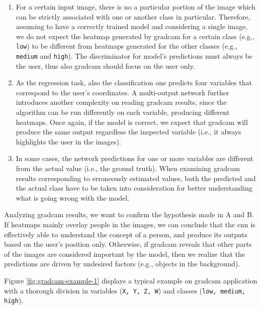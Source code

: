 \renewcommand{\labelenumi}{\Alph{enumi}}
\begin{enumerate}
    \item For a certain input image, there is no a particular portion of the image which can be strictly associated with one or another class in particular. Therefore, assuming to have a correctly trained model and considering a single image, we do not expect the heatmap generated by \gls{gradcam} for a certain class (e.g., \texttt{low}) to be different from heatmaps generated for the other classes (e.g., \texttt{medium} and \texttt{high}). The discriminator for model's predictions must always be the user, thus also \gls{gradcam} should focus on the user only.
    \item As the regression task, also the classification one predicts four variables that correspond to the user's coordinates. A multi-output network further introduces another complexity on reading \gls{gradcam} results, since the algorithm can be run differently on each variable, producing different heatmaps. Once again, if the model is correct, we expect that \gls{gradcam} will produce the same output regardless the inspected variable (i.e., it always highlights the user in the images).
    \item In some cases, the network predictions for one or more variables are different from the actual value (i.e., the ground truth). When examining \gls{gradcam} results corresponding to erroneously estimated values, both the predicted and the actual class have to be taken into consideration for better understanding what is going wrong with the model.
\end{enumerate}

Analyzing \gls{gradcam} results, we want to confirm the hypothesis made in A and B. If heatmaps mainly overlay people in the images, we can conclude that the \gls{cnn} is effectively able to understand the concept of a person, and produce its outputs based on the user's position only. Otherwise, if \gls{gradcam} reveals that other parts of the images are considered important by the model, then we realize that the predictions are driven by undesired factors (e.g., objects in the background).

\medskip

Figure \ref{fig:gradcam-example-1} displays a typical example on \gls{gradcam} application with a thorough division in variables (\texttt{X, Y, Z, W}) and classes (\texttt{low, medium, high}).

